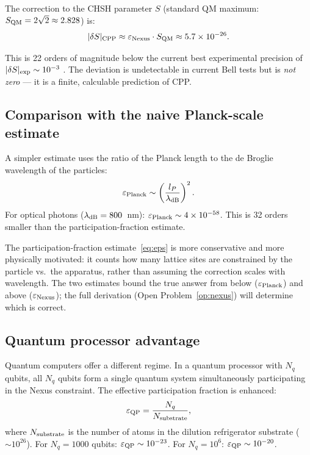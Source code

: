 \documentclass[11pt,a4paper]{article}
\newcommand{\lP}{l_P}
\newcommand{\eps}{\varepsilon}
\begin{document}
The correction to the CHSH parameter $S$ (standard QM maximum:
$S_{\rm QM} = 2\sqrt{2} \approx 2.828$) is:
\begin{equation}
|\delta S|_{\rm CPP} \approx \eps_{\rm Nexus} \cdot S_{\rm QM}
\approx 5.7 \times 10^{-26}.
\label{eq:deltaS}
\end{equation}

This is 22 orders of magnitude below the current best experimental
precision of $|\delta S|_{\rm exp} \sim 10^{-3}$ \citep{li2018}.
The deviation is undetectable in current Bell tests but is
\emph{not zero} --- it is a finite, calculable prediction of CPP.

\subsection{Comparison with the naive Planck-scale estimate}

A simpler estimate uses the ratio of the Planck length to the de
Broglie wavelength of the particles:
\begin{equation}
\eps_{\rm Planck} \sim \left(\frac{\lP}{\lambda_{\rm dB}}\right)^2.
\label{eq:eps_planck}
\end{equation}
For optical photons ($\lambda_{\rm dB} = 800$~nm):
$\eps_{\rm Planck} \sim 4 \times 10^{-58}$.
This is 32 orders smaller than the participation-fraction estimate.

The participation-fraction estimate~\eqref{eq:eps} is more
conservative and more physically motivated: it counts how many
lattice sites are constrained by the particle vs.\ the apparatus,
rather than assuming the correction scales with wavelength.  The
two estimates bound the true answer from below ($\eps_{\rm Planck}$)
and above ($\eps_{\rm Nexus}$); the full derivation
(Open Problem~\ref{op:nexus}) will determine which is correct.

\subsection{Quantum processor advantage}

Quantum computers offer a different regime.  In a quantum processor
with $N_q$ qubits, all $N_q$ qubits form a single quantum system
simultaneously participating in the Nexus constraint.  The effective
participation fraction is enhanced:
\begin{equation}
\eps_{\rm QP} = \frac{N_q}{N_{\rm substrate}},
\label{eq:eps_QP}
\end{equation}
where $N_{\rm substrate}$ is the number of atoms in the dilution
refrigerator substrate ($\sim 10^{26}$).  For $N_q = 1000$ qubits:
$\eps_{\rm QP} \sim 10^{-23}$.  For $N_q = 10^6$: $\eps_{\rm QP}
\sim 10^{-20}$.
\end{document}
